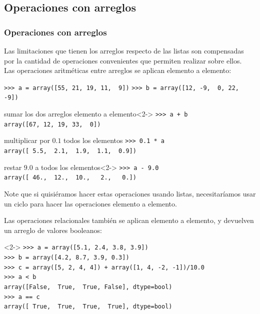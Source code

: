 \subsection{Operaciones con arreglos}
\begin{frame}[fragile]
\frametitle{Operaciones con arreglos}
Las limitaciones que tienen los arreglos respecto de las listas son compensadas por la cantidad de operaciones convenientes que permiten realizar sobre ellos.
\\
\bigskip
Las operaciones aritm\'{e}ticas entre arreglos se aplican elemento a elemento:
\fontsize{12}{12}\selectfont
\begin{exampleblock}{}
\verb|>>> a = array([55, 21, 19, 11,  9])|
\verb|>>> b = array([12, -9,  0, 22, -9])|
\end{exampleblock}
\begin{exampleblock}{sumar los dos arreglos elemento a elemento}<2->
\verb|>>> a + b| \\
\verb|array([67, 12, 19, 33,  0])|
\end{exampleblock}
\end{frame}
\begin{frame}[fragile]
\begin{exampleblock}{multiplicar por $0.1$ todos los elementos}
\verb|>>> 0.1 * a| \\
\verb|array([ 5.5,  2.1,  1.9,  1.1,  0.9])|
\end{exampleblock}
\begin{exampleblock}{restar $9.0$ a todos los elementos}<2->
\verb|>>> a - 9.0| \\
\verb|array([ 46.,  12.,  10.,   2.,   0.])|
\end{exampleblock}
Note que si quisi\'{e}ramos hacer estas operaciones usando listas, necesitar\'{i}amos usar un ciclo para hacer las operaciones elemento a elemento.
\end{frame}
\begin{frame}[fragile]
Las operaciones relacionales tambi\'{e}n se aplican elemento a elemento, y devuelven un arreglo de valores booleanos:
\fontsize{12}{12}\selectfont
\begin{exampleblock}{}<2->
\verb|>>> a = array([5.1, 2.4, 3.8, 3.9])| \\
\verb|>>> b = array([4.2, 8.7, 3.9, 0.3])| \\
\verb|>>> c = array([5, 2, 4, 4]) + array([1, 4, -2, -1])/10.0|\\
\pause
\verb|>>> a < b| \\
\pause
\verb|array([False,  True,  True, False], dtype=bool)| \\
\pause
\verb|>>> a == c| \\
\pause
\verb|array([ True,  True,  True,  True], dtype=bool)|
\end{exampleblock}
\end{frame}
